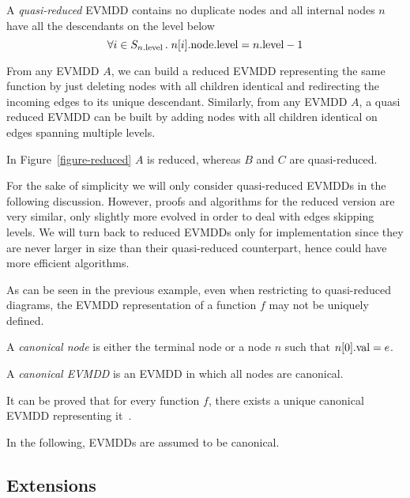 \documentclass[a4paper,oneside,11pt,pdftex]{llncs}
\newcommand{\val}[1]{#1{\rm .val}}
\newcommand{\node}[1]{#1{\rm .node}}
\newcommand{\level}[1]{#1{\rm .level}}
\begin{document}
\begin{definition}\label{definition-quasi-reduced}
A \emph{quasi-reduced} EVMDD contains no duplicate nodes and all internal nodes $n$ 
have all the descendants on the level below
$$
\forall i \in S_{\level{n}}\,.\; \level{\node{n[i]}} = \level{n}-1
$$
\end{definition}

From any EVMDD $A$, we can build a reduced EVMDD representing the same function
by just deleting nodes with all children identical and redirecting the incoming edges to its unique descendant.
Similarly, from any EVMDD $A$, a quasi reduced EVMDD can be built by adding
nodes with all children identical on edges spanning multiple levels.

\begin{example}
In Figure~\vref{figure-reduced} $A$ is reduced, whereas $B$ and $C$ are quasi-reduced.
\end{example}

For the sake of simplicity we will only consider quasi-reduced EVMDDs in the following discussion. However, proofs and algorithms for the reduced version are very similar, only slightly more evolved in order to deal with edges skipping levels. We will turn back to reduced EVMDDs only for implementation since they are never larger in size than their quasi-reduced counterpart, hence could have more efficient algorithms.

As can be seen in the previous example, even when restricting to quasi-reduced diagrams,
the EVMDD representation of a function $f$ may not be uniquely defined.

\begin{definition}
A \emph{canonical node} is either the terminal node or a node $n$ such that $\val{n[0]} = e$.

A \emph{canonical EVMDD} is an EVMDD in which all nodes are canonical.
\end{definition}

It can be proved that for every function $f$, there exists a unique
canonical EVMDD representing it~\cite{FMCAD2002}.

In the following, EVMDDs are assumed to be canonical.

\subsection{Extensions%
  \label{subsection-extensions}}
\end{document}
